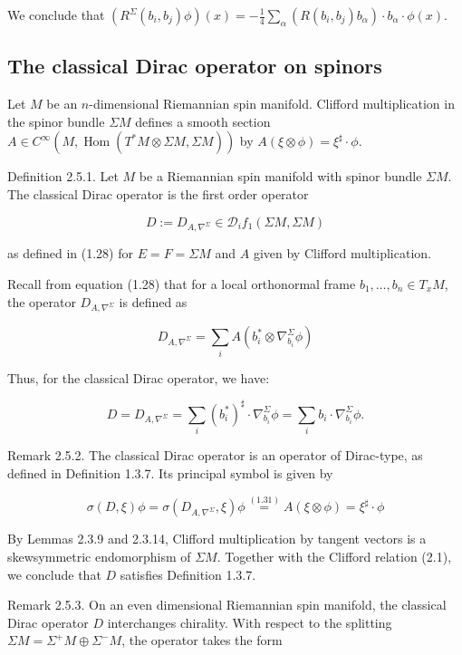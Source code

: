 \documentclass[10pt, letterpaper]{article}
\begin{document}
We conclude that $\left(R^{\Sigma}\left(b_{i}, b_{j}\right) \phi\right)(x)=-\frac{1}{4} \sum_{\alpha}\left(R\left(b_{i}, b_{j}\right) b_{\alpha}\right) \cdot b_{\alpha} \cdot \phi(x)$.


\pagebreak

\subsection{The classical Dirac operator on spinors}

Let $M$ be an $n$-dimensional Riemannian spin manifold. Clifford multiplication in the spinor bundle $\Sigma M$ defines a smooth section $A \in C^{\infty}\left(M, \operatorname{Hom}\left(T^{*} M \otimes \Sigma M, \Sigma M\right)\right)$ by $A(\xi \otimes \phi)=\xi^{\sharp} \cdot \phi$.

Definition 2.5.1. Let $M$ be a Riemannian spin manifold with spinor bundle $\Sigma M$. The classical Dirac operator is the first order operator

$$
D:=D_{A, \nabla^{\Sigma}} \in \mathscr{D}_{i} f_{1}(\Sigma M, \Sigma M)
$$

as defined in (1.28) for $E=F=\Sigma M$ and $A$ given by Clifford multiplication.

Recall from equation (1.28) that for a local orthonormal frame $b_{1}, \ldots, b_{n} \in T_{x} M$, the operator $D_{A, \nabla^{\Sigma}}$ is defined as

$$
D_{A, \nabla^{\Sigma}}=\sum_{i} A\left(b_{i}^{*} \otimes \nabla_{b_{i}}^{\Sigma} \phi\right)
$$

Thus, for the classical Dirac operator, we have:

$$
D=D_{A, \nabla^{\Sigma}}=\sum_{i}\left(b_{i}^{*}\right)^{\sharp} \cdot \nabla_{b_{i}}^{\Sigma} \phi=\sum_{i} b_{i} \cdot \nabla_{b_{i}}^{\Sigma} \phi .
$$

Remark 2.5.2. The classical Dirac operator is an operator of Dirac-type, as defined in Definition 1.3.7. Its principal symbol is given by

$$
\sigma(D, \xi) \phi=\sigma\left(D_{A, \nabla^{\Sigma}}, \xi\right) \phi \stackrel{(1.31)}{=} A(\xi \otimes \phi)=\xi^{\sharp} \cdot \phi
$$

By Lemmas 2.3.9 and 2.3.14, Clifford multiplication by tangent vectors is a skewsymmetric endomorphism of $\Sigma M$. Together with the Clifford relation (2.1), we conclude that $D$ satisfies Definition 1.3.7.

Remark 2.5.3. On an even dimensional Riemannian spin manifold, the classical Dirac operator $D$ interchanges chirality. With respect to the splitting $\Sigma M=\Sigma^{+} M \oplus \Sigma^{-} M$, the operator takes the form
\end{document}
